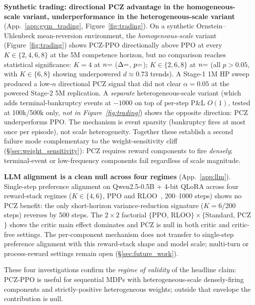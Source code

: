 \documentclass[11pt,a4paper]{article}
\DeclareRobustCommand{\cnum}[1]{\unskip}
\begin{document}
\textbf{Synthetic trading: directional PCZ advantage in the homogeneous-scale variant, underperformance in the heterogeneous-scale variant} (App.~\ref{app:gym_trading}, Figure~\ref{fig:trading}). On a synthetic Ornstein--Uhlenbeck mean-reversion environment, the \emph{homogeneous-scale} variant (Figure~\ref{fig:trading}) shows PCZ-PPO directionally above PPO at every $K{\in}\{2,4,6,8\}$ at the 5M competence horizon, but no comparison reaches statistical significance: $K{=}4$ at $n{=}\cnum{tv172_n}$ ($\Delta{=}\cnum{tv172_delta}$, $p{=}\cnum{tv172_welch_p}$); $K{\in}\{2,6,8\}$ at $n{=}\cnum{tv173_n}$ (all $p{>}0.05$, with $K{\in}\{6,8\}$ showing underpowered $d{\approx}0.73$ trends). A Stage-1 1M HP sweep produced a low-$n$ directional PCZ signal that did not clear $\alpha{=}0.05$ at the powered Stage-2 5M replication. A \emph{separate} heterogeneous-scale variant (which adds terminal-bankruptcy events at $-1000$ on top of per-step P\&L $O(1)$, tested at 100k/500k only, \emph{not in Figure~\ref{fig:trading}}) shows the opposite direction: PCZ underperforms PPO. The mechanism is event sparsity (bankruptcy fires at most once per episode), not scale heterogeneity. Together these establish a second failure mode complementary to the weight-sensitivity cliff (§\ref{sec:weight_sensitivity}): PCZ requires reward components to fire \emph{densely}; terminal-event or low-frequency components fail regardless of scale magnitude.

\textbf{LLM alignment is a clean null across four regimes} (App.~\ref{app:llm}). Single-step preference alignment on Qwen2.5-0.5B + 4-bit QLoRA across four reward-stack regimes ($K{\in}\{4,6\}$, PPO and RLOO~\cite{ahmadian2024rloo}, 200--1000 steps) shows no PCZ benefit: the only short-horizon variance-reduction signature ($K{=}6$/200 steps) reverses by 500 steps. The $2{\times}2$ factorial $\{$PPO, RLOO$\}{\times}\{$Standard, PCZ$\}$ shows the critic main effect dominates and PCZ is null in both critic and critic-free settings. The per-component mechanism does not transfer to single-step preference alignment with this reward-stack shape and model scale; multi-turn or process-reward settings remain open (§\ref{sec:future_work}).

These four investigations confirm the \emph{regime of validity} of the headline claim: PCZ-PPO is useful for sequential MDPs with heterogeneous-scale densely-firing components and strictly-positive heterogeneous weights; outside that envelope the contribution is null.

\end{document}
